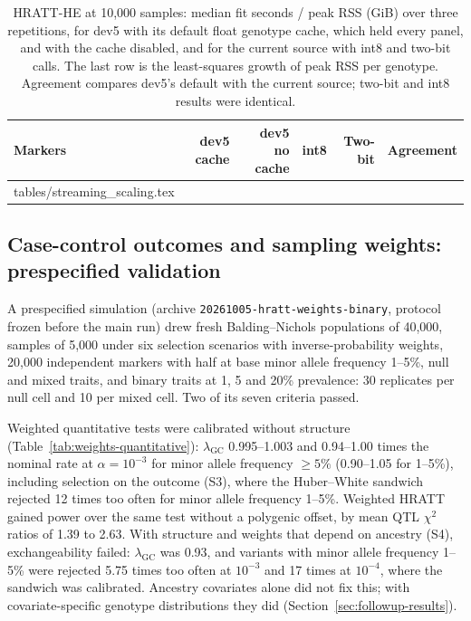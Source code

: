 \documentclass[11pt]{article}
\makeatletter
\newcommand{\lgc}{\lambda_{\mathrm{GC}}}
\newcommand{\code}[1]{\texttt{#1}}
\newcommand{\tabinput}[1]{\@@input #1 }
\makeatother
\begin{document}
\begin{table}[htbp]
 \centering\small
 \caption{HRATT-HE at 10{,}000 samples: median fit seconds / peak RSS (GiB)
 over three repetitions, for dev5 with its default float genotype cache,
 which held every panel, and with the cache disabled, and for the current
 source with int8 and two-bit calls. The last row is the least-squares growth
 of peak RSS per genotype. Agreement compares dev5's default with the current
 source; two-bit and int8 results were identical.}
 \label{tab:streaming-scaling}
 \begin{tabularx}{\textwidth}{@{}>{\raggedright\arraybackslash}Xrrrrl@{}}
 \toprule
 Markers & dev5 cache & dev5 no cache & int8 & Two-bit & Agreement \\
 \midrule
 \tabinput{tables/streaming_scaling.tex}
 \bottomrule
 \end{tabularx}
\end{table}

\subsection{Case-control outcomes and sampling weights: prespecified validation}
\label{sec:weights-binary-results}

A prespecified simulation (archive \code{20261005-}\allowbreak\code{hratt-weights-binary},
protocol frozen before the main run) drew fresh Balding--Nichols populations
of 40,000, samples of 5,000 under six selection scenarios with
inverse-probability weights, 20,000 independent markers with half at base
minor allele frequency 1--5\%, null and mixed traits, and binary traits at
1, 5 and 20\% prevalence: 30 replicates per null cell and 10 per mixed cell.
Two of its seven criteria passed.

Weighted quantitative tests were calibrated without structure
(Table~\ref{tab:weights-quantitative}): $\lgc$ 0.995--1.003 and 0.94--1.00
times the nominal rate at $\alpha=10^{-3}$ for minor allele frequency
$\ge5\%$ (0.90--1.05 for 1--5\%), including selection on the
outcome (S3), where the Huber--White sandwich rejected 12 times too often
for minor allele frequency 1--5\%.
Weighted HRATT gained power over the same test without a polygenic offset,
by mean QTL $\chi^2$ ratios of 1.39 to 2.63. With structure and weights that
depend on ancestry (S4), exchangeability failed: $\lgc$ was 0.93, and
variants with minor allele frequency 1--5\% were rejected 5.75 times too often
at $10^{-3}$ and 17 times at $10^{-4}$, where the sandwich was calibrated.
Ancestry covariates alone did not fix this; with covariate-specific
genotype distributions they did (Section~\ref{sec:followup-results}).
\end{document}
